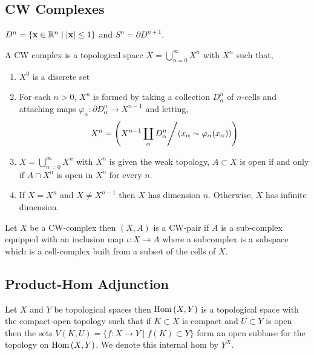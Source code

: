 \documentclass[12pt]{extarticle}
\begin{document}
\subsection{CW Complexes}

\begin{definition}
$D^n = \{ \mathbf{x} \in \mathbb{R}^n \mid |\mathbf{x}| \le 1 \}$ and $S^n = \partial D^{n + 1}$. 
\end{definition}

\begin{definition}
A CW complex is a topological space $X = \bigcup\limits_{n = 0}^{\infty} X^n$ with $X^n$ such that,
\begin{enumerate}
\item $X^0$ is a discrete set
\item For each $n > 0$, $X^n$ is formed by taking a collection $D_\alpha^n$ of $n$-cells and attaching maps $\varphi_\alpha : \partial D_{\alpha}^n \to X^{n - 1}$ and letting,
\[X^n = \left( X^{n - 1} \coprod\limits_{\alpha} D_\alpha^n \middle/  (x_\alpha \sim \varphi_\alpha(x_\alpha)) \right) \] 
\item $X = \bigcup\limits_{n = 0}^{\infty} X^n$ with $X^n$ is given the weak topology, $A \subset X$ is open if and only if $A \cap X^n$ is open in $X^n$ for every $n$.
\item If $X = X^n$ and $X \neq X^{n-1}$ then $X$ has dimension $n$. Otherwise, $X$ has infinite dimension. 
\end{enumerate}
\end{definition}

\begin{definition}
Let $X$ be a CW-complex then $(X, A)$ is a CW-pair if $A$ is a sub-complex equipped with an inclusion map $\iota : X \to A$ where a subcomplex is a subspace which is a cell-complex built from a subset of the cells of $X$. 
\end{definition}

\subsection{Product-Hom Adjunction}


\begin{definition}
Let $X$ and $Y$ be topological spaces then $\mathrm{Hom}\left( X, Y \right)$ is a topological space with the compact-open topology such that if $K \subset X$ is compact and $U \subset Y$ is open then the sets $V(K, U) = \{ f : X \to Y \mid f(K) \subset Y \}$ form an open subbase for the topology on $\mathrm{Hom}\left( X, Y \right)$. We denote this internal hom by $Y^X$. 
\end{definition}
\end{document}
